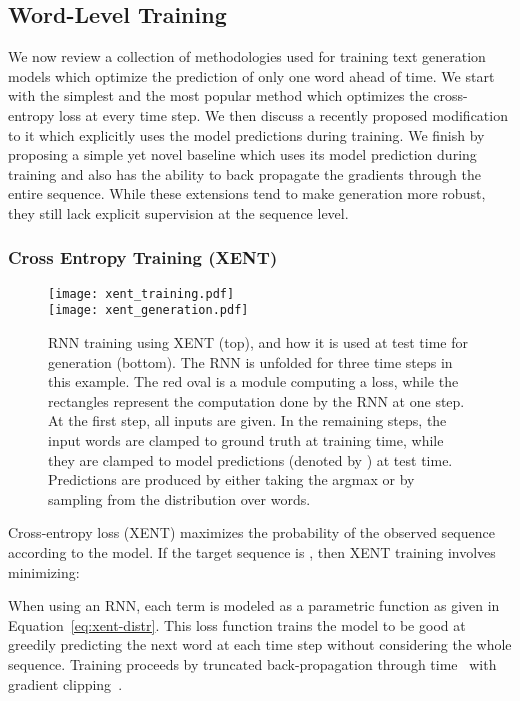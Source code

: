 \documentclass{article} \usepackage{iclr2016_conference,times}
\begin{document}
\subsection{Word-Level Training}
We now review a collection of methodologies used for training text generation models which 
optimize the prediction of only one word ahead of time. 
We start with the simplest and the most popular method which optimizes the cross-entropy 
loss at every time step. We then discuss a recently proposed modification to it 
which explicitly uses the model predictions during training. 
We finish by proposing a simple yet novel baseline which uses its model prediction during 
training and also has the ability to back propagate the gradients through the entire sequence. 
While these extensions tend to make generation more robust, 
they still lack explicit supervision at the sequence level. 

\subsubsection{Cross Entropy Training (XENT)} \label{model-xent}
\begin{figure}[!t]
	   \texttt{[image: xent\_training.pdf]}\\
	   \texttt{[image: xent\_generation.pdf]}
  \caption{RNN training using XENT (top), and how it is used at test time for generation (bottom). The RNN is unfolded for three time steps in this example. The red oval is a module computing a loss, while the rectangles represent the computation done by the RNN at one step. At the first step, all inputs are given. In the remaining steps, the input words are clamped to ground truth at training time, while they are clamped to model predictions (denoted by ) at test time. Predictions are produced by either taking the argmax or by sampling from the distribution over words. 
}
  \label{fig:xent}
\end{figure}
Cross-entropy loss (XENT) maximizes the probability of the observed sequence according to the model.
If the target sequence is , then XENT training involves minimizing: 

When using an RNN, each term  is modeled as a parametric function as given in Equation~\eqref{eq:xent-distr}. This loss function trains the model to be good at greedily predicting the next word at each time step without considering the whole sequence. Training proceeds by truncated back-propagation through time~\citep{bptt} with gradient clipping~\citep{mikolov-2010}.
\end{document}
